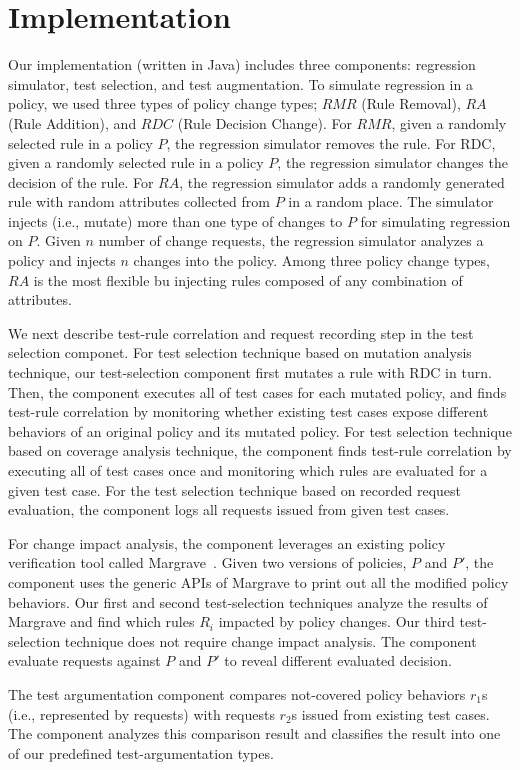\section{Implementation} \label{sec:implementation}

Our implementation (written in Java) includes three components: regression simulator, test selection,
and test augmentation. To simulate regression in a policy, 
we used three types of policy change types; $RMR$ (Rule Removal), $RA$ (Rule Addition), and $RDC$ (Rule Decision Change). For $RMR$, given a randomly selected rule in a policy $P$,
the regression simulator removes the rule. For RDC,
given a randomly selected rule in a policy $P$, the regression simulator changes
the decision of the rule.
For $RA$, the regression simulator adds a randomly generated
rule with random attributes collected from $P$ in a random place.
The simulator injects (i.e., mutate) more than one type of changes to $P$ for simulating
regression on $P$.
Given $n$ number of change requests, the regression simulator analyzes a policy and injects $n$ changes
into the policy. Among three policy change types, $RA$ is the most flexible
bu injecting rules composed of any combination of attributes.

We next describe test-rule correlation and request recording step in the test selection
componet. 
For test selection technique based on mutation analysis technique,
our test-selection component first mutates a rule with RDC in turn.
Then, the component executes all of test cases for each mutated policy, and
finds test-rule correlation by monitoring 
whether existing test cases expose different behaviors of an original policy and its mutated policy.
For test selection technique based on coverage analysis technique,
the component finds test-rule correlation by executing all of test cases once and monitoring
which rules are evaluated for a given test case.
For the test selection technique based on recorded request evaluation,
the component logs all requests issued from given test cases.

For change impact analysis, the component leverages an existing policy verification tool called Margrave~\cite{fisler05:verification}. 
Given two versions of policies, $P$ and $P'$, 
the component uses the generic APIs of Margrave to
print out all the modified policy behaviors.
Our first and second test-selection techniques analyze the results of Margrave and
find which rules $R_i$ impacted by policy changes.
Our third test-selection technique does not require change impact analysis. The
component evaluate requests against $P$ and $P'$ to reveal different evaluated decision.

The test argumentation component compares
not-covered policy behaviors $r_1$s (i.e., represented by requests) with requests $r_2$s issued
from existing test cases. The component analyzes this comparison result and classifies
the result into one of our predefined test-argumentation types. 
 



